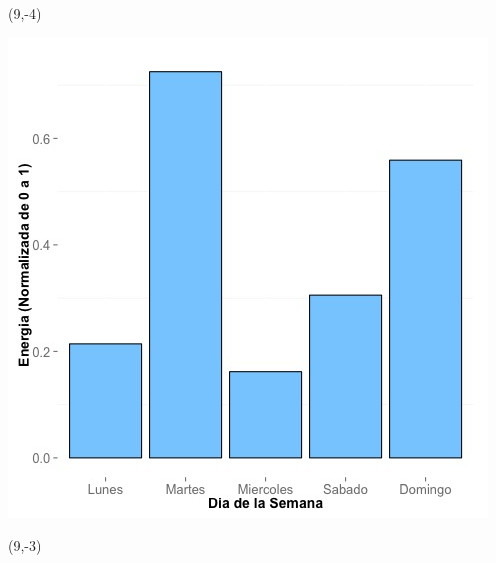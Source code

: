 \documentclass{article}\usepackage[]{graphicx}\usepackage[]{color}
\newenvironment{knitrout}{}{} %
\begin{document}
 \begin{textblock}{1}(9,-4)
\begin{minipage}{20em}
\begingroup

\endgroup
\end{minipage}
\end{textblock}


\begin{knitrout}
\color{fgcolor}
\includegraphics[scale=0.65]{figure/A7_day_of_week_plot} 
\end{knitrout}


 \begin{textblock}{1}(9,-3)
\begin{minipage}{20em}
\begingroup

\endgroup
\end{minipage}
\end{textblock}
\end{document}
